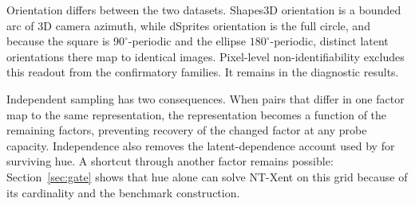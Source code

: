 \documentclass[10pt]{article}
\begin{document}
Orientation differs between the two datasets. Shapes3D orientation is a bounded arc of 3D camera
azimuth, while dSprites orientation is the full circle, and because the square is
$90^\circ$-periodic and the ellipse $180^\circ$-periodic, distinct latent orientations there map to
identical images. Pixel-level non-identifiability excludes this readout from the confirmatory families. It remains in the diagnostic results.

Independent sampling has two consequences. When pairs that differ in one factor map to the same
representation, the representation becomes a function of the remaining factors, preventing recovery
of the changed factor at any probe capacity. Independence also removes the latent-dependence account
used by \citet{vonkugelgen2021self} for surviving hue. A shortcut through another factor remains
possible: Section~\ref{sec:gate} shows that hue alone can solve NT-Xent on this grid because of its
cardinality and the benchmark construction.
\end{document}
